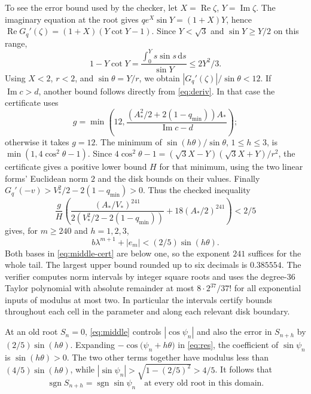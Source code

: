 \documentclass[11pt]{article}
\newcommand{\sgn}{\operatorname{sgn}}
\newcommand{\Real}{\operatorname{Re}}
\newcommand{\Imag}{\operatorname{Im}}
\begin{document}
To see the error bound used by the checker, let \(X=\Real\zeta\),
\(Y=\Imag\zeta\). The imaginary equation at the root gives
\(qe^X\sin Y=(1+X)Y\), hence
\(\Real G_q'(\zeta)=(1+X)(Y\cot Y-1)\).
Since \(Y<\sqrt3\) and \(\sin Y\ge Y/2\) on this range,
\[
 1-Y\cot Y=\frac{\int_0^Y s\sin s\,\mathrm ds}{\sin Y}
       \le 2Y^2/3 .
\]
Using \(X<2\), \(r<2\), and \(\sin\theta=Y/r\), we obtain
\(|G_q'(\zeta)|/\sin\theta<12\). If \(\Imag c>d\), another
bound follows directly from \eqref{eq:deriv}. In that case the
certificate uses
\[
 g=\min\left(12,\frac{(A_*^2/2+2(1-q_{\min}))A_*}{\Imag c-d}\right);
\]
otherwise it takes \(g=12\).
The minimum of \(\sin(h\theta)/\sin\theta\), \(1\le h\le3\), is
\(\min(1,4\cos^2\theta-1)\). Since
\(4\cos^2\theta-1=(\sqrt3 X-Y)(\sqrt3 X+Y)/r^2\),
the certificate gives a positive lower bound \(H\) for that
minimum, using the two linear forms' Euclidean norm \(2\)
and the disk bounds on their values. Finally
\(G_q'(-v)>V_*^2/2-2(1-q_{\min})>0\).
Thus the checked inequality
\begin{equation}\label{eq:middle-cert}
 \frac{g}{H}\left(
   \frac{(A_*/V_*)^{241}}{2(V_*^2/2-2(1-q_{\min}))}
   +18(A_*/2)^{241}\right)<2/5
\end{equation}
gives, for \(m\ge240\) and \(h=1,2,3\),
\begin{equation}\label{eq:middle}
 b\lambda^{m+1}+|e_m|<(2/5)\sin(h\theta).
\end{equation}
Both bases in \eqref{eq:middle-cert} are below one, so
the exponent \(241\) suffices for the whole tail.
The largest upper bound rounded up to six decimals is \(0.385554\).
The verifier computes norm intervals by integer square roots and
uses the degree-36 Taylor polynomial with absolute remainder at most
\(8\cdot2^{37}/37!\) for all exponential inputs of modulus at most two.
In particular the intervals certify bounds throughout each cell in
the parameter and along each relevant disk boundary.

At an old root \(S_n=0\), \eqref{eq:middle} controls
\(|\cos\psi_n|\) and also the error in \(S_{n+h}\) by
\((2/5)\sin(h\theta)\). Expanding
\(-\cos\bigl(\psi_n+h\theta\bigr)\) in \eqref{eq:res},
the coefficient of \(\sin\psi_n\) is \(\sin(h\theta)>0\).
The two other terms together have modulus less than
\((4/5)\sin(h\theta)\), while
\(|\sin\psi_n|>\sqrt{1-(2/5)^2}>4/5\). It follows that
\begin{equation}\label{eq:sign}
 \sgn S_{n+h}=\sgn\sin\psi_n\quad\text{at every old root in this domain}.
\end{equation}
\end{document}
